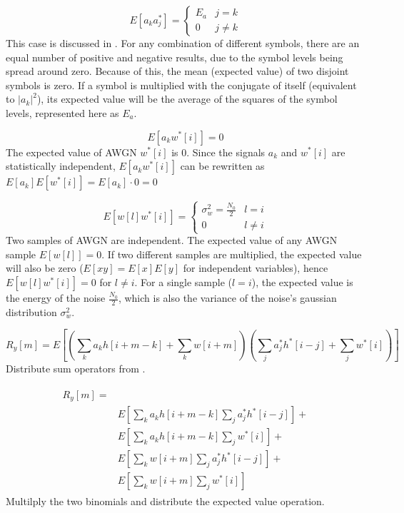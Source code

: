 \documentclass[11pt]{article}
\begin{document}
\begin{equation}\label{symbol_ea}
    E[a_k a_j^*] =
    \begin{cases}
        E_a & j=k      \\
        0   & j \neq k
    \end{cases}
\end{equation}
This case is discussed in . For any combination of
different symbols, there are an equal number of positive and negative results,
due to the symbol levels being spread around zero. Because of this, the mean
(expected value) of two disjoint symbols is zero. If a symbol is multiplied with
the conjugate of itself (equivalent to $|a_k|^2$), its expected value will be
the average of the squares of the symbol levels, represented here as $E_a$.

\begin{equation} \label{enoise_zero}
    E\left[a_k w^*[i]\right]= 0
\end{equation}
The expected value of AWGN $w^*[i]$ is $0$. Since the signals $a_k$ and $w^*[i]$
are statistically independent, $E\left[a_k w^*[i]\right]$ can be rewritten as
$E[a_k]E[w^*[i]] = E[a_k]\cdot 0 = 0$

\begin{equation}\label{noise_e}
    E \left[w[l]w^*[i]\right] =
    \begin{cases}
        \sigma^2_w = \frac{N_0}{2} & l = i    \\
        0                          & l \neq i
    \end{cases}
\end{equation}
Two samples of AWGN are independent. The expected value of any AWGN sample
$E[w[l]] = 0$. If two different samples are multiplied, the expected value will
also be zero ($E[xy] = E[x]E[y]$ for independent variables), hence
$E[w[l]w^*[i]] = 0$ for $l \neq i$. For a single sample ($l = i$), the expected
value is the energy of the noise $\frac{N_0}{2}$, which is also the variance of
the noise's gaussian distribution $\sigma_w^2$.

\begin{equation}
    R_y[m] = E\left[ \left( \sum_k a_k h[i+m-k] + \sum_k w[i+m] \right) \left(
        \sum_j a_j^* h^*[i-j] + \sum_j w^*[i] \right) \right]
\end{equation}
Distribute sum operators from .

\begin{align}
    \begin{split}
        R_y[m] = & \\
        & E\left[ \sum_k a_k h[i+m-k] \sum_j a_j^* h^*[i-j] \right] + \\
        & E\left[ \sum_k a_k h[i+m-k] \sum_j w^*[i] \right] +         \\
        & E\left[ \sum_k w[i+m] \sum_j a_j^* h^*[i-j] \right] +       \\
        & E\left[ \sum_k w[i+m] \sum_j w^*[i] \right]
    \end{split}
\end{align}
Multilply the two binomials and distribute the expected value operation.
\end{document}

